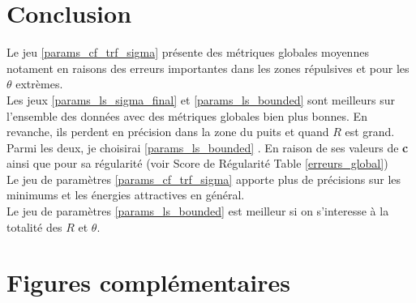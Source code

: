\documentclass[10pt,a4paper]{article}
\begin{document}
\section{Conclusion}

Le jeu \ref{params_cf_trf_sigma} présente des métriques globales moyennes notament en raisons des erreurs importantes
dans les zones répulsives et pour les $\theta$ extrèmes.\\
Les jeux \ref{params_ls_sigma_final} et \ref{params_ls_bounded} sont meilleurs
sur l'ensemble des données avec des métriques globales bien plus bonnes. En 
revanche, ils perdent en précision dans la zone du puits et quand $R$ est grand.
Parmi les deux, je choisirai \ref{params_ls_bounded} . En raison de ses valeurs de 
\textbf{c} ainsi que pour sa régularité (voir Score de Régularité Table \ref{erreurs_global})\\

Le jeu de paramètres \ref{params_cf_trf_sigma} apporte plus de précisions
sur les minimums et les énergies attractives en général.\\

Le jeu de paramètres \ref{params_ls_bounded} est meilleur si on s'interesse
à la totalité des $R$ et $\theta$.

\clearpage{}
\newpage{}
\appendix

\section{Figures complémentaires}
\end{document}
